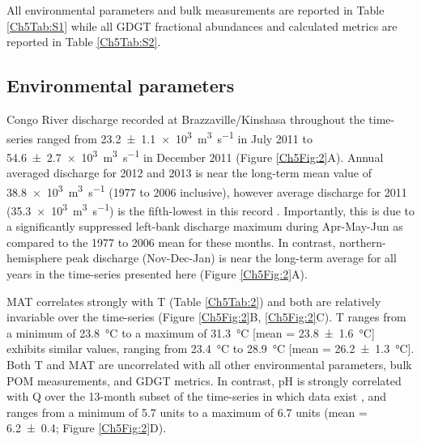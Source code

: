 All environmental parameters and bulk measurements are reported in Table \ref{Ch5Tab:S1} while all GDGT fractional abundances and calculated metrics are reported in Table \ref{Ch5Tab:S2}. 

\subsection{Environmental parameters}

Congo River discharge recorded at Brazzaville/Kinshasa throughout the time-series ranged from \SI{23.2 \pm 1.1 e3}{m^3.s^{-1}} in July 2011 to \SI{54.6 \pm 2.7 e3}{m^3.s^{-1}} in December 2011 (Figure \ref{Ch5Fig:2}A). Annual averaged discharge for 2012 and 2013 is near the long-term mean value of \SI{38.8 e3}{m^3.s^{-1}} (1977 to 2006 inclusive), however average discharge for 2011 (\SI{35.3 e3}{m^3.s^{-1}}) is the fifth-lowest in this record \citep{Spencer:2012en}. Importantly, this is due to a significantly suppressed left-bank discharge maximum during Apr-May-Jun as compared to the 1977 to 2006 mean for these months. In contrast, northern-hemisphere peak discharge (Nov-Dec-Jan) is near the long-term average for all years in the time-series presented here (Figure \ref{Ch5Fig:2}A).

MAT correlates strongly with T (Table \ref{Ch5Tab:2}) and both are relatively invariable over the time-series (Figure \ref{Ch5Fig:2}B, \ref{Ch5Fig:2}C). T ranges from a minimum of \SI{23.8}{\celsius} to a maximum of \SI{31.3}{\celsius} [mean = \SI{23.8 \pm 1.6}{\celsius}] exhibits similar values, ranging from \SI{23.4}{\celsius} to \SI{28.9}{\celsius} [mean = \SI{26.2 \pm 1.3}{\celsius}]. Both T and MAT are uncorrelated with all other environmental parameters, bulk POM measurements, and GDGT metrics. In contrast, pH is strongly correlated with Q over the 13-month subset of the time-series in which data exist \citep[$r = -0.97$, $p$-value = \num{1.25e-8};][]{Wang:2013js}, and ranges from a minimum of \num{5.7} units to a maximum of \num{6.7} units (mean = \num{6.2 \pm 0.4}; Figure \ref{Ch5Fig:2}D).


